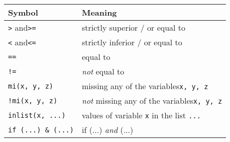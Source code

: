 \begin{table}
	\begin{center}
  	\footnotesize
  	\begin{tabular}{ll}
    	\toprule
    	Symbol & Meaning \\
    	\midrule
    	\quad \texttt{>} and\texttt{>=} & strictly superior / or equal to \\
    	\quad \texttt{<} and\texttt{<=} & strictly inferior / or equal to  \\
    	\quad \texttt{==} & equal to \\
    	\quad \texttt{!=} & \emph{not} equal to \\
    	\quad \texttt{mi(x, y, z)} & missing any of the variables\texttt{x, y, z}\\
    	\quad \texttt{!mi(x, y, z)} & \emph{not} missing any of the variables\texttt{x, y, z}\\
    	\quad \texttt{inlist(x, ...)} & values of variable \texttt{x} in the list \texttt{...}\\
    	\quad \texttt{if (...) \& (...)} & if (...) \emph{and} (...)\\
    	\bottomrule
  	\end{tabular}
	\end{center}
	\label{tbl:logical-symbols}%
\end{table}